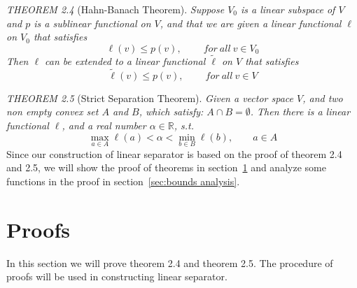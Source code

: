\documentclass{article}
\begin{document}
\emph{THEOREM 2.4} (Hahn-Banach Theorem).
\emph{Suppose $V_0$ is a linear subspace of $V$ and $p$ is a sublinear functional on $V$, and that we are given a linear functional $\ell$ on $V_0$ that
	satisfies
	\begin{equation*}
		\ell(v)\le p(v),\qquad ~for~all~v \in V_0
	\end{equation*}
	Then $\ell$ can be extended to a linear functional $\tilde{\ell}$ on $V$ that satisfies
	\begin{equation*}
		\tilde{\ell}(v)\le p(v),\qquad~for~all~v \in V
	\end{equation*}
}\par
\emph{THEOREM 2.5} (Strict Separation Theorem).
\emph{Given a vector space $V$, and two non empty convex set $A$ and $B$, which satisfy:
	$A\cap B=\emptyset$. Then there is a linear functional $\ell$, and a real number $\alpha\in\mathbb{R}$, s.t.
	\begin{equation*}
		\max_{a\in A}{\ell(a)}<\alpha<\min_{b\in B}{\ell(b)},\qquad a\in A
	\end{equation*}
}
Since our construction of linear separator is based on the proof of theorem 2.4 and 2.5, we will show the proof of theorems in section~\ref{sec:proof}
and analyze some functions in the proof in section~\ref{sec:bounds analysis}.

\section{Proofs}
\label{sec:proof}
In this section we will prove theorem 2.4 and theorem 2.5. The procedure of proofs will be used in constructing linear separator.
\end{document}
